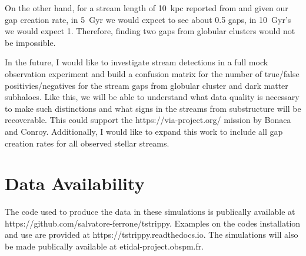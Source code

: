 \documentclass{aa}
\begin{document}
  On the other hand, for a stream length of 10~kpc reported from \citet{2020ApJ...889...70B} and given our gap creation rate, in 5~Gyr we would expect to see about 0.5 gaps, in 10~Gyr's we would expect 1. Therefore, finding two gaps from globular clusters would not be impossible.

  In the future, I would like to investigate stream detections in a full mock observation experiment and build a confusion matrix for the number of true/false positivies/negatives for the stream gaps from globular cluster and dark matter subhaloes. Like this, we will be able to understand what data quality is necessary to make such distinctions and what signs in the streams from substructure will be recoverable. This could support the https://via-project.org/ mission by Bonaca and Conroy. Additionally, I would like to expand this work to include all gap creation rates for all observed stellar streams. 

\section*{Data Availability}

  The code used to produce the data in these simulations is publically available at https://github.com/salvatore-ferrone/tstrippy. Examples on the codes installation and use are provided at https://tstrippy.readthedocs.io. The simulations will also be made publically available at etidal-project.obspm.fr.







\end{document}
